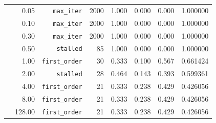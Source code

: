 \begin{tabular}{@{}lrrrrrrr@{}}
 & 0.05 & \texttt{max\_iter} & 2000 & 1.000 & 0.000 & 0.000 & 1.000000 \\ 
 & 0.10 & \texttt{max\_iter} & 2000 & 1.000 & 0.000 & 0.000 & 1.000000 \\ 
 & 0.30 & \texttt{max\_iter} & 2000 & 1.000 & 0.000 & 0.000 & 1.000000 \\ 
 & 0.50 & \texttt{stalled} & 85 & 1.000 & 0.000 & 0.000 & 1.000000 \\ 
 & 1.00 & \texttt{first\_order} & 30 & 0.333 & 0.100 & 0.567 & 0.661424 \\ 
 & 2.00 & \texttt{stalled} & 28 & 0.464 & 0.143 & 0.393 & 0.599361 \\ 
 & 4.00 & \texttt{first\_order} & 21 & 0.333 & 0.238 & 0.429 & 0.426056 \\ 
 & 8.00 & \texttt{first\_order} & 21 & 0.333 & 0.238 & 0.429 & 0.426056 \\ 
 & 128.00 & \texttt{first\_order} & 21 & 0.333 & 0.238 & 0.429 & 0.426056 \\ 
\bottomrule
\end{tabular}
